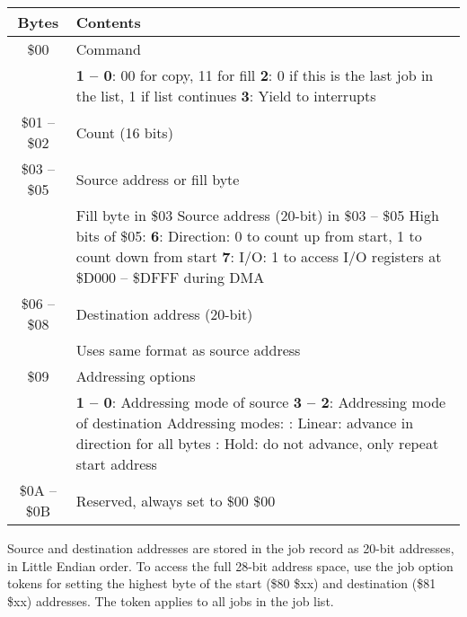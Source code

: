 \begin{center}
\begin{tabular}{|c|p{6cm}|}
\hline
{\bf Bytes} & {\bf Contents} \\
\hline

\$00 & Command \\
& {\bf 1 -- 0}: 00 for copy, 11 for fill \newline
{\bf 2}: 0 if this is the last job in the list, 1 if list continues \newline
{\bf 3}: Yield to interrupts \\
\hline

\$01 -- \$02 & Count (16 bits) \\
\hline

\$03 -- \$05 & Source address or fill byte \\
& Fill byte in \$03 \newline
Source address (20-bit) in \$03 -- \$05 \newline
High bits of \$05: \newline
{\bf 6}: Direction: 0 to count up from start, 1 to count down from start \newline
{\bf 7}: I/O: 1 to access I/O registers at \$D000 -- \$DFFF during DMA \\
\hline

\$06 -- \$08 & Destination address (20-bit) \\
& Uses same format as source address \\
\hline

\$09 & Addressing options \\
& {\bf 1 -- 0}: Addressing mode of source \newline
{\bf 3 -- 2}: Addressing mode of destination \newline
Addressing modes: \newline
00: Linear: advance in direction for all bytes \newline
10: Hold: do not advance, only repeat start address \\
\hline

\$0A -- \$0B & Reserved, always set to \$00 \$00 \\
\hline

\end{tabular}
\end{center}

Source and destination addresses are stored in the job record as 20-bit
addresses, in Little Endian order. To access the full 28-bit address space, use
the job option tokens for setting the highest byte of the start (\$80 \$xx) and
destination (\$81 \$xx) addresses. The token applies to all jobs in the job list.

